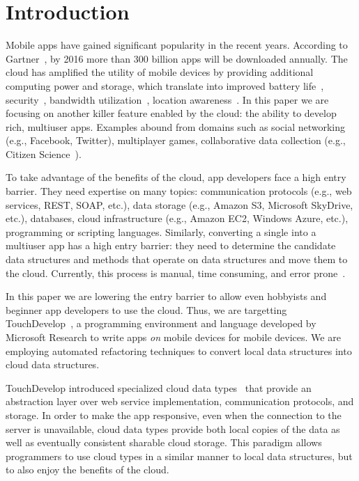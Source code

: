 \documentclass{sigplanconf}
\begin{document}
\section{Introduction}

Mobile apps have gained significant popularity in the recent years. According to Gartner~\cite{Gartner}, by 2016 more than 300 billion apps will be downloaded annually. The cloud has amplified the utility of mobile devices by providing additional computing power and storage, which translate into improved battery life~\cite{Chen:2012:CCO:2310096.2310228}, security~\cite{Oberheide:2008:VIS:1622103.1629656}, bandwidth utilization~\cite{Vemulapalli:2013:PSD:2492348.2492353}, location awareness~\cite{kansal2013latency}. In this paper we are focusing on another killer feature enabled by the cloud: the ability to develop rich, multiuser apps. Examples abound from domains such as social networking (e.g., Facebook, Twitter), multiplayer games, collaborative data collection (e.g., Citizen Science~\cite{cohn2008citizen}). 

To take advantage of the benefits of the cloud, app developers face a high entry barrier. They need expertise on many topics: communication protocols (e.g., web services, REST, SOAP, etc.), data storage (e.g., Amazon S3, Microsoft SkyDrive, etc.), databases, cloud infrastructure (e.g., Amazon EC2, Windows Azure, etc.),  programming or scripting languages. Similarly, converting a single into a multiuser app has a high entry barrier: they need to determine the candidate data structures and methods that operate on data structures and move them to the cloud. Currently, this process is manual, time consuming, and error prone~\cite{khan2013survey}.

In this paper we are lowering the entry barrier to allow even hobbyists and beginner app developers to use the cloud. Thus, we are targetting TouchDevelop~\cite{Tillmann2011TPC20482372048245}, a programming environment and language developed by Microsoft Research to write apps \emph{on} mobile devices for mobile devices. We are employing automated refactoring techniques to convert local data structures into cloud data structures.

TouchDevelop introduced specialized cloud data types~\cite{burckhardt2012cloud} that provide an abstraction layer over web service implementation, communication protocols, and storage.  In order to make the app responsive, even when the connection to the server is unavailable, cloud data types provide both local copies of the data as well as eventually consistent sharable cloud storage. This paradigm allows programmers to use cloud types in a similar manner to local data structures, but to also enjoy the benefits of the cloud.
\end{document}
